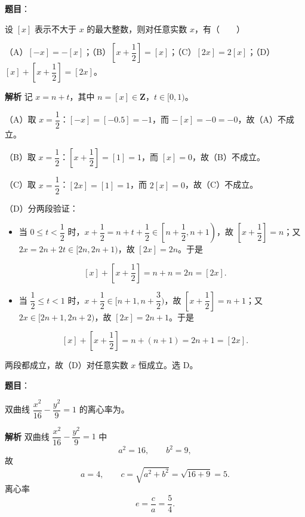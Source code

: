 \begin{answer}

\textbf{题目}：

设 $[x]$ 表示不大于 $x$ 的最大整数，则对任意实数 $x$，有\mbox{（　　）}

（A）$[-x]=-[x]$；（B）$\left[x+\dfrac12\right]=[x]$；（C）$[2x]=2[x]$；（D）$[x]+\left[x+\dfrac12\right]=[2x]$。

\textbf{解析}
记 $x=n+t$，其中 $n=[x]\in\mathbf Z$，$t\in[0,1)$。

（A）取 $x=\dfrac12$：$[-x]=[-0.5]=-1$，而 $-[x]=-0=-0$，故（A）不成立。

（B）取 $x=\dfrac12$：$\left[x+\dfrac12\right]=[1]=1$，而 $[x]=0$，故（B）不成立。

（C）取 $x=\dfrac12$：$[2x]=[1]=1$，而 $2[x]=0$，故（C）不成立。

（D）分两段验证：
\begin{itemize}
\item 当 $0\leqslant t<\dfrac12$ 时，$x+\dfrac12=n+t+\dfrac12\in\left[n+\dfrac12,n+1\right)$，故 $\left[x+\dfrac12\right]=n$；又 $2x=2n+2t\in[2n,2n+1)$，故 $[2x]=2n$。于是
\end{itemize}
\nopagebreak[4]
\[[x]+\left[x+\dfrac12\right]=n+n=2n=[2x].\]
\begin{itemize}
\item 当 $\dfrac12\leqslant t<1$ 时，$x+\dfrac12\in[n+1,n+\dfrac32)$，故 $\left[x+\dfrac12\right]=n+1$；又 $2x\in[2n+1,2n+2)$，故 $[2x]=2n+1$。于是
\end{itemize}
\nopagebreak[4]
\[[x]+\left[x+\dfrac12\right]=n+(n+1)=2n+1=[2x].\]

两段都成立，故（D）对任意实数 $x$ 恒成立。选 D。


\end{answer}
\begin{answer}

\textbf{题目}：

双曲线 $\dfrac{x^2}{16}-\dfrac{y^2}{9}=1$ 的离心率为\gkblank{}。

\textbf{解析}
双曲线 $\dfrac{x^2}{16}-\dfrac{y^2}{9}=1$ 中
\nopagebreak[4]
\[a^2=16,\qquad b^2=9,\]
故
\nopagebreak[4]
\[a=4,\qquad c=\sqrt{a^2+b^2}=\sqrt{16+9}=5.\]
离心率
\nopagebreak[4]
\[e=\frac ca=\frac54.\]


\end{answer}
